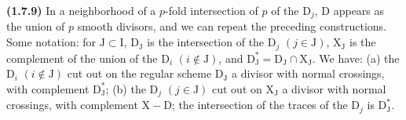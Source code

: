 \documentclass[11pt,leqno]{article}
\begin{document}
\textbf{(1.7.9)} In a neighborhood of a \(p\)-fold intersection of \(p\) of the \(\mathrm{D}_j\), \(\mathrm{D}\) appears as the union of \(p\) smooth divisors, and we can repeat the preceding constructions. Some notation: for \(\mathrm{J}\subset\mathrm{I}\), \(\mathrm{D}_{\mathrm{J}}\) is the intersection of the \(\mathrm{D}_j\) \((j\in\mathrm{J})\), \(\mathrm{X}_{\mathrm{J}}\) is the complement of the union of the \(\mathrm{D}_i\) \((i\notin\mathrm{J})\), and \(\mathrm{D}_{\mathrm{J}}^*=\mathrm{D}_{\mathrm{J}}\cap\mathrm{X}_{\mathrm{J}}\). We have: (a) the \(\mathrm{D}_i\) \((i\notin\mathrm{J})\) cut out on the regular scheme \(\mathrm{D}_{\mathrm{J}}\) a divisor with normal crossings, with complement \(\mathrm{D}_{\mathrm{J}}^*\); (b) the \(\mathrm{D}_j\) \((j\in\mathrm{J})\) cut out on \(\mathrm{X}_{\mathrm{J}}\) a divisor with normal crossings, with complement \(\mathrm{X}-\mathrm{D}\); the intersection of the traces of the \(\mathrm{D}_j\) is \(\mathrm{D}_{\mathrm{J}}^*\).
\end{document}
